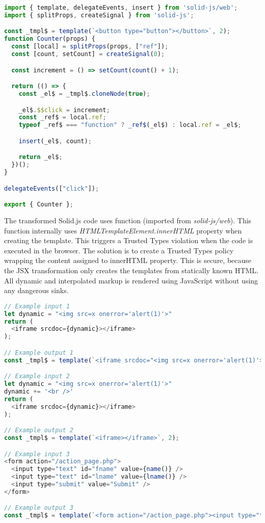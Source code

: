 \bigskip
\begin{lstlisting}[language=JavaScript, caption=Example of a Solid.js component after Babel transformation]
import { template, delegateEvents, insert } from 'solid-js/web';
import { splitProps, createSignal } from 'solid-js';

const _tmpl$ = template(`<button type="button"></button>`, 2);
function Counter(props) {
  const [local] = splitProps(props, ["ref"]);
  const [count, setCount] = createSignal(0);

  const increment = () => setCount(count() + 1);

  return (() => {
    const _el$ = _tmpl$.cloneNode(true);

    _el$.$$click = increment;
    const _ref$ = local.ref;
    typeof _ref$ === "function" ? _ref$(_el$) : local.ref = _el$;

    insert(_el$, count);

    return _el$;
  })();
}

delegateEvents(["click"]);

export { Counter };
\end{lstlisting}

The transformed Solid.js code uses  function (imported from \textit{solid-js/web}).
This function internally uses \textit{HTMLTemplateElement.innerHTML} property when creating the
template. This triggers a Trusted Types violation when the code is executed in the browser. The
solution is to create a Trusted Types policy wrapping the content assigned to innerHTML property.
This is secure, because the JSX transformation only creates the templates from statically known
HTML. All dynamic and interpolated markup is rendered using JavaScript without using any dangerous
sinks.

\bigskip
\begin{lstlisting}[language=JavaScript, caption=Examples of JSX transformations]
// Example input 1
let dynamic = "<img src=x onerror='alert(1)'>"
return (
  <iframe srcdoc={dynamic}></iframe>
);

// Example output 1
const _tmpl$ = template(`<iframe srcdoc="<img src=x onerror='alert(1)'>"></iframe>`, 3);

// Example input 2
let dynamic = "<img src=x onerror='alert(1)'>"
dynamic += '<br />'
return (
  <iframe srcdoc={dynamic}></iframe>
);

// Example output 2
const _tmpl$ = template(`<iframe></iframe>`, 2);

// Example input 3
<form action="/action_page.php">
  <input type="text" id="fname" value={name()} />
  <input type="text" id="lname" value={lname()} />
  <input type="submit" value="Submit" />
</form>

// Example output 3
const _tmpl$ = template(`<form action="/action_page.php"><input type="text" id="fname"><input type="text" id="lname"><input type="submit" value="Submit"></form>`, 5);
\end{lstlisting}

